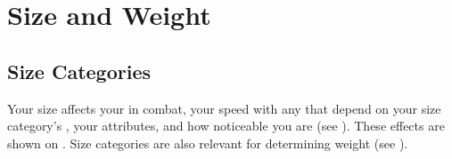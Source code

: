 \section{Size and Weight}\label{Size and Weight}

  \subsection{Size Categories}\label{Size Categories}
    Your size affects your  in combat, your speed with any  that depend on your size category's , your attributes, and how noticeable you are (see ).
    These effects are shown on .
    Size categories are also relevant for determining weight (see ).

